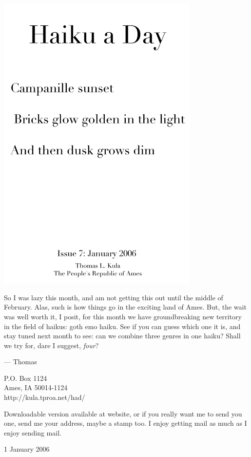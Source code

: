 \documentclass[12pt]{article}
\begin{document}
\includegraphics[width=101mm]{frontpage.png}

\newpage

So I was lazy this month, and am not getting this out
until the middle of February. Alas, such is how things
go in the exciting land of Ames. But, the wait was well
worth it, I posit, for this month we have groundbreaking
new territory in the field of haikus: goth emo haiku. See
if you can guess which one it is, and stay tuned next 
month to see: can we combine three genres in one haiku? 
Shall we try for, dare I suggest, {\em four}?

--- Thomas

P.O. Box 1124 \\
Ames, IA 50014-1124 \\
http://kula.tproa.net/had/

Downloadable version available at website, or if you really
want me to send you one, send me your address, maybe a
stamp too. I enjoy getting mail as much as I enjoy sending
mail.\\

\setlength{\parskip}{1mm}

1 January 2006
\end{document}
